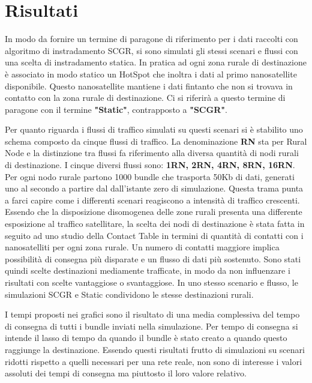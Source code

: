 \documentclass[12pt,a4paper,oneside]{book}
\begin{document}
		\section{Risultati}
		In modo da fornire un termine di paragone di riferimento per i dati raccolti con algoritmo di instradamento SCGR, si sono simulati gli stessi scenari e flussi con una scelta di instradamento statica. In pratica ad ogni zona rurale di destinazione è associato in modo statico un HotSpot che inoltra i dati al primo nanosatellite disponibile. Questo nanosatellite mantiene i dati fintanto che non si trovava in contatto con la zona rurale di destinazione. Ci si riferirà a questo termine di paragone con il termine {\bf "Static"}, contrapposto a {\bf "SCGR"}.
		
		Per quanto riguarda i flussi di traffico simulati su questi scenari si è stabilito uno schema composto da cinque flussi di traffico. La denominazione {\bf RN} sta per Rural Node e la distinzione tra flussi fa riferimento alla diversa quantità di nodi rurali di destinazione. I cinque diversi flussi sono: {\bf 1RN, 2RN, 4RN, 8RN, 16RN}. Per ogni nodo rurale partono 1000 bundle che trasporta 50Kb di dati, generati uno al secondo a partire dal dall'istante zero di simulazione. Questa trama punta a farci capire come i differenti scenari reagiscono a intensità di traffico crescenti. Essendo che la disposizione disomogenea delle zone rurali presenta una differente esposizione al traffico satellitare, la scelta dei nodi di destinazione è stata fatta in seguito ad uno studio della Contact Table in termini di quantità di contatti con i nanosatelliti per ogni zona rurale. Un numero di contatti maggiore implica possibilità di consegna più disparate e un flusso di dati più sostenuto. Sono stati quindi scelte destinazioni mediamente trafficate, in modo da non influenzare i risultati con scelte vantaggiose o svantaggiose. In uno stesso scenario e flusso, le simulazioni SCGR e Static condividono le stesse destinazioni rurali.
		
		I tempi proposti nei grafici sono il risultato di una media complessiva del tempo di consegna di tutti i bundle inviati nella simulazione. Per tempo di consegna si intende il lasso di tempo da quando il bundle è stato creato a quando questo raggiunge la destinazione. Essendo questi risultati frutto di simulazioni su scenari ridotti rispetto a quelli necessari per una rete reale, non sono di interesse i valori assoluti dei tempi di consegna ma piuttosto il loro valore relativo.
		
\end{document}
